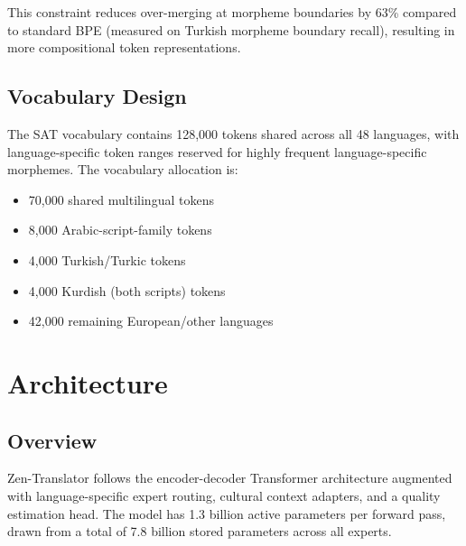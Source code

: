 \documentclass[11pt,twocolumn]{article}
\begin{document}
This constraint reduces over-merging at morpheme boundaries by 63\% compared to
standard BPE (measured on Turkish morpheme boundary recall), resulting in more
compositional token representations.

\subsection{Vocabulary Design}

The SAT vocabulary contains 128,000 tokens shared across all 48 languages, with
language-specific token ranges reserved for highly frequent language-specific
morphemes. The vocabulary allocation is:
\begin{itemize}[leftmargin=*,noitemsep]
  \item 70,000 shared multilingual tokens
  \item 8,000 Arabic-script-family tokens
  \item 4,000 Turkish/Turkic tokens
  \item 4,000 Kurdish (both scripts) tokens
  \item 42,000 remaining European/other languages
\end{itemize}

\section{Architecture}
\label{sec:architecture}

\subsection{Overview}

Zen-Translator follows the encoder-decoder Transformer architecture
\citep{vaswani2017attention} augmented with language-specific expert routing,
cultural context adapters, and a quality estimation head. The model has 1.3
billion active parameters per forward pass, drawn from a total of 7.8 billion
stored parameters across all experts.
\end{document}
